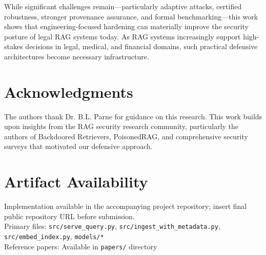 \documentclass[conference]{IEEEtran}
\begin{document}
While significant challenges remain—particularly adaptive attacks, certified robustness, stronger provenance assurance, and formal benchmarking—this work shows that engineering-focused hardening can materially improve the security posture of legal RAG systems today. As RAG systems increasingly support high-stakes decisions in legal, medical, and financial domains, such practical defensive architectures become necessary infrastructure.

\section*{Acknowledgments}

The authors thank Dr. B.L. Parne for guidance on this research. This work builds upon insights from the RAG security research community, particularly the authors of Backdoored Retrievers, PoisonedRAG, and comprehensive security surveys that motivated our defensive approach.

\section*{Artifact Availability}

Implementation available in the accompanying project repository; insert final public repository URL before submission.\\
Primary files: \texttt{src/serve\_query.py}, \texttt{src/ingest\_with\_metadata.py}, \texttt{src/embed\_index.py}, \texttt{models/*}\\
Reference papers: Available in \texttt{papers/} directory
\end{document}
